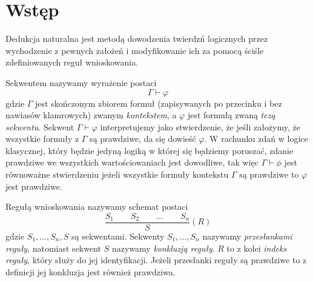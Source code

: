 \documentclass{article}
\begin{document}
\begin{abstract}
TODO
\end{abstract}

\begin{otherlanguage}{english}
\begin{abstract}
TODO
\end{abstract}
\end{otherlanguage}


\newpage

\tableofcontents


\newpage

\section{Wstęp}

Dedukcja naturalna jest metodą dowodzenia twierdzń logicznych przez wychodzenie z pewnych założeń i modyfikowanie ich za pomocą
ściśle zdefiniowanych reguł wnioskowania. 

\begin{tcolorbox}[
    colback=gray!5,
    colframe=black,
    fonttitle=\bfseries,
    title=Definicja (sekwent)
]
Sekwentem nazywamy wyrażenie postaci
\[
\Gamma \vdash \varphi
\]
gdzie $\Gamma$ jest skończonym zbiorem formuł (zapisywanych po przecinku i bez nawiasów klamrowych) zwanym \emph{kontekstem},
a $\varphi$ jest formułą zwaną \emph{tezą sekwentu}. Sekwent $\Gamma \vdash \varphi$ interpretujemy jako stwierdzenie, że jeśli założymy, że wszystkie formuły z $\Gamma$ są prawdziwe, 
da się dowieść $\varphi$. W rachunku zdań w logice klasycznej, który będzie jedyną logiką w której się będziemy poruszać, zdanie prawdziwe we wszystkich wartościowaniach jest dowodliwe, tak więc $\Gamma \vdash \phi$ jest równoważne stwierdzeniu jeżeli wszystkie formuły kontekstu $\Gamma$ są prawdziwe to $\varphi$ jest prawdziwe.
\end{tcolorbox}

\begin{tcolorbox}[title=Definicja (reguła wnioskowania)]
Regułą wnioskowania nazywamy schemat postaci
\[
\frac{S_1 \qquad S_2 \qquad \dots \qquad S_n}{S}(R)
\]
gdzie $S_1,\dots,S_n,S$ są sekwentami. Sekwenty $S_1,\dots,S_n$ nazywamy \emph{przesłankami reguły}, natomiast sekwent $S$ nazywamy \emph{konkluzją reguły}. $R$ to z kolei \emph{indeks reguły}, który służy do jej identyfikacji. 
Jeżeli przesłanki reguły są prawdziwe to z definicji jej konkluzja jest również prawdziwa.
\end{tcolorbox}
\end{document}
